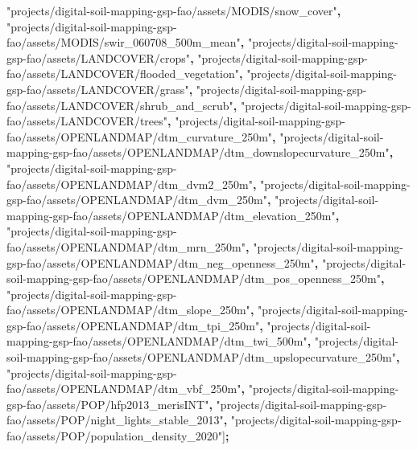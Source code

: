 \documentclass[
  10pt,
  b5paper,
  oneside]{book}
\newenvironment{Shaded}{\begin{snugshade}}{\end{snugshade}}
\newcommand{\NormalTok}[1]{#1}
\newcommand{\OperatorTok}[1]{\textcolor[rgb]{0.81,0.36,0.00}{\textbf{#1}}}
\newcommand{\StringTok}[1]{\textcolor[rgb]{0.31,0.60,0.02}{#1}}
\begin{document}
\begin{Shaded}
\begin{Highlighting}[]
\StringTok{"projects/digital{-}soil{-}mapping{-}gsp{-}fao/assets/MODIS/snow\_cover"}\OperatorTok{,}
\StringTok{"projects/digital{-}soil{-}mapping{-}gsp{-}fao/assets/MODIS/swir\_060708\_500m\_mean"}\OperatorTok{,}
\StringTok{"projects/digital{-}soil{-}mapping{-}gsp{-}fao/assets/LANDCOVER/crops"}\OperatorTok{,}
\StringTok{"projects/digital{-}soil{-}mapping{-}gsp{-}fao/assets/LANDCOVER/flooded\_vegetation"}\OperatorTok{,}
\StringTok{"projects/digital{-}soil{-}mapping{-}gsp{-}fao/assets/LANDCOVER/grass"}\OperatorTok{,}
\StringTok{"projects/digital{-}soil{-}mapping{-}gsp{-}fao/assets/LANDCOVER/shrub\_and\_scrub"}\OperatorTok{,}
\StringTok{"projects/digital{-}soil{-}mapping{-}gsp{-}fao/assets/LANDCOVER/trees"}\OperatorTok{,}
\StringTok{"projects/digital{-}soil{-}mapping{-}gsp{-}fao/assets/OPENLANDMAP/dtm\_curvature\_250m"}\OperatorTok{,}
\StringTok{"projects/digital{-}soil{-}mapping{-}gsp{-}fao/assets/OPENLANDMAP/dtm\_downslopecurvature\_250m"}\OperatorTok{,}
\StringTok{"projects/digital{-}soil{-}mapping{-}gsp{-}fao/assets/OPENLANDMAP/dtm\_dvm2\_250m"}\OperatorTok{,}
\StringTok{"projects/digital{-}soil{-}mapping{-}gsp{-}fao/assets/OPENLANDMAP/dtm\_dvm\_250m"}\OperatorTok{,}
\StringTok{"projects/digital{-}soil{-}mapping{-}gsp{-}fao/assets/OPENLANDMAP/dtm\_elevation\_250m"}\OperatorTok{,}
\StringTok{"projects/digital{-}soil{-}mapping{-}gsp{-}fao/assets/OPENLANDMAP/dtm\_mrn\_250m"}\OperatorTok{,}
\StringTok{"projects/digital{-}soil{-}mapping{-}gsp{-}fao/assets/OPENLANDMAP/dtm\_neg\_openness\_250m"}\OperatorTok{,}
\StringTok{"projects/digital{-}soil{-}mapping{-}gsp{-}fao/assets/OPENLANDMAP/dtm\_pos\_openness\_250m"}\OperatorTok{,}
\StringTok{"projects/digital{-}soil{-}mapping{-}gsp{-}fao/assets/OPENLANDMAP/dtm\_slope\_250m"}\OperatorTok{,}
\StringTok{"projects/digital{-}soil{-}mapping{-}gsp{-}fao/assets/OPENLANDMAP/dtm\_tpi\_250m"}\OperatorTok{,}
\StringTok{"projects/digital{-}soil{-}mapping{-}gsp{-}fao/assets/OPENLANDMAP/dtm\_twi\_500m"}\OperatorTok{,}
\StringTok{"projects/digital{-}soil{-}mapping{-}gsp{-}fao/assets/OPENLANDMAP/dtm\_upslopecurvature\_250m"}\OperatorTok{,}
\StringTok{"projects/digital{-}soil{-}mapping{-}gsp{-}fao/assets/OPENLANDMAP/dtm\_vbf\_250m"}\OperatorTok{,}
\StringTok{"projects/digital{-}soil{-}mapping{-}gsp{-}fao/assets/POP/hfp2013\_merisINT"}\OperatorTok{,}
\StringTok{"projects/digital{-}soil{-}mapping{-}gsp{-}fao/assets/POP/night\_lights\_stable\_2013"}\OperatorTok{,}
\StringTok{"projects/digital{-}soil{-}mapping{-}gsp{-}fao/assets/POP/population\_density\_2020"}\NormalTok{]}\OperatorTok{;}
\end{Highlighting}
\end{Shaded}
\end{document}
